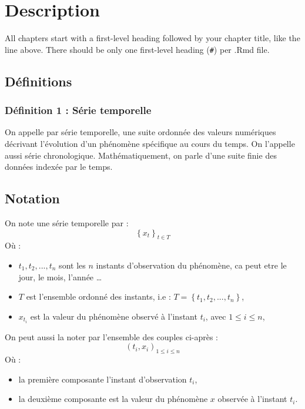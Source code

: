 \documentclass[
]{book}
\providecommand{\tightlist}{%
  \setlength{\itemsep}{0pt}\setlength{\parskip}{0pt}}
\theoremstyle{definition}
\theoremstyle{definition}
\theoremstyle{definition}
\theoremstyle{definition}
\theoremstyle{remark}
\begin{document}
\hypertarget{description}{%
\chapter{Description}\label{description}}

All chapters start with a first-level heading followed by your chapter title, like the line above. There should be only one first-level heading (\texttt{\#}) per .Rmd file.

\hypertarget{duxe9finitions}{%
\section{Définitions}\label{duxe9finitions}}

\hypertarget{duxe9finition-1-suxe9rie-temporelle}{%
\subsection{Définition 1 : Série temporelle}\label{duxe9finition-1-suxe9rie-temporelle}}

On appelle par série temporelle, une suite ordonnée des valeurs numériques décrivant l'évolution d'un phénomène spécifique au cours du temps. On l'appelle aussi série chronologique. Mathématiquement, on parle d'une suite finie des données indexée par le temps.

\hypertarget{notation}{%
\section{Notation}\label{notation}}

On note une série temporelle par :
\[\left\{x_t \right\}_{t \in T}\]
Où :

\begin{itemize}
\item
  \(t_1, t_2, ..., t_n\) sont les \(n\) instants d'observation du phénomène, ca peut etre le jour, le mois, l'année \ldots{}
\item
  \(T\) est l'ensemble ordonné des instants, i.e : \(T = \left\{t_1, t_2, ..., t_n \right\}\),
\item
  \(x_{t_i}\) est la valeur du phénomène observé à l'instant \(t_i\), avec \(1 \le i \le n\),
\end{itemize}

On peut aussi la noter par l'ensemble des couples ci-après :
\[(t_i, x_i)_{1 \le i \le n}\]
Où :

\begin{itemize}
\tightlist
\item
  la première composante l'instant d'observation \(t_i\),
\item
  la deuxième composante est la valeur du phénomène \(x\) observée à l'instant \(t_i\).
\end{itemize}
\end{document}
